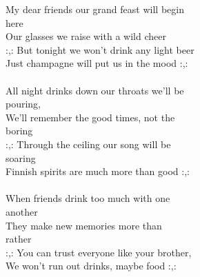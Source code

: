 
My dear friends our grand feast will begin \\ here \\ Our glasses we raise with a wild cheer \\ :,: But tonight we won't drink any light beer \\ Just champagne will put us in the mood :,: \\ \hspace{10mm} \\ All night drinks down our throats we'll be \\ pouring, \\ We'll remember the good times, not the \\ boring \\ :,: Through the ceiling our song will be \\ soaring \\ Finnish spirits are much more than good :,: \\ \hspace{10mm} \\ When friends drink too much with one \\ another \\ They make new memories more than \\ rather \\ :,: You can trust everyone like your brother, \\ We won't run out drinks, maybe food :,: